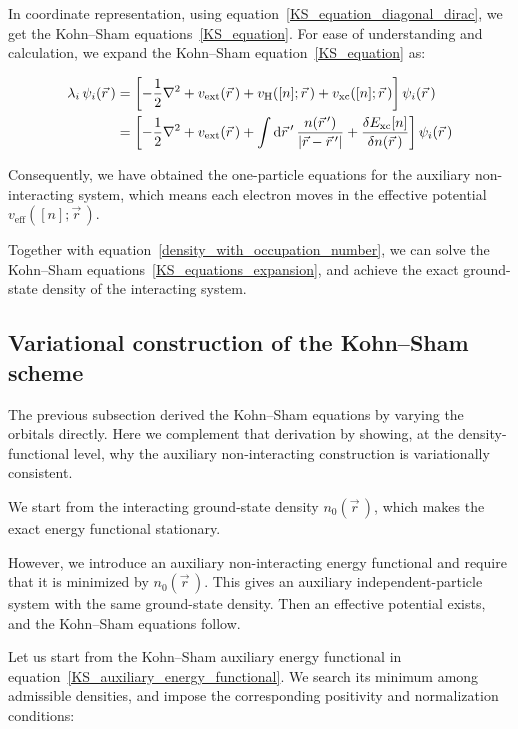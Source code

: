 In coordinate representation, using equation~\eqref{KS_equation_diagonal_dirac}, we get the Kohn--Sham equations~\eqref{KS_equation}.
For ease of understanding and calculation, we expand the Kohn--Sham equation~\eqref{KS_equation} as:

\begin{equation}
\begin{aligned}
    \lambda_i\,\psi_i(\vec{r}\,)
    &=\left[
    -\frac{1}{2}\nabla^2
    +v_\mathrm{ext}(\vec{r}\,)
    +v_\mathrm{H}([n];\vec{r}\,)
    +v_\mathrm{xc}([n];\vec{r}\,)
    \right]\psi_i(\vec{r}\,) \\
    &=\left[
    -\frac{1}{2}\nabla^2
    +v_\mathrm{ext}(\vec{r}\,)
    +\int\mathrm{d}{\vec{r}\,'}\,\frac{n(\vec{r}\,')}{|\vec{r}-\vec{r}\,'|}
    +\frac{\delta E_\mathrm{xc}[n]}{\delta n(\vec{r}\,)}
    \right]\psi_i(\vec{r}\,)
\end{aligned}
\label{KS_equations_expansion}
\end{equation}

Consequently, we have obtained the one-particle equations for the auxiliary non-interacting system,
which means each electron moves in the effective potential $v_\mathrm{eff}([n];\vec{r}\,)$.

Together with equation~\eqref{density_with_occupation_number},
we can solve the Kohn--Sham equations~\eqref{KS_equations_expansion},
and achieve the exact ground-state density of the interacting system.

\subsection{Variational construction of the Kohn--Sham scheme}

The previous subsection derived the Kohn--Sham equations by varying the orbitals directly. Here we complement that derivation by showing, at the density-functional level, why the auxiliary non-interacting construction is variationally consistent.

We start from the interacting ground-state density $n_0(\vec{r}\,)$, which makes the exact energy functional stationary.

However, we introduce an auxiliary non-interacting energy functional and require that it is minimized by $n_0(\vec{r}\,)$.
This gives an auxiliary independent-particle system with the same ground-state density.
Then an effective potential exists, and the Kohn--Sham equations follow.

Let us start from the Kohn--Sham auxiliary energy functional in equation~\eqref{KS_auxiliary_energy_functional}.
We search its minimum among admissible densities,
and impose the corresponding positivity and normalization conditions:

